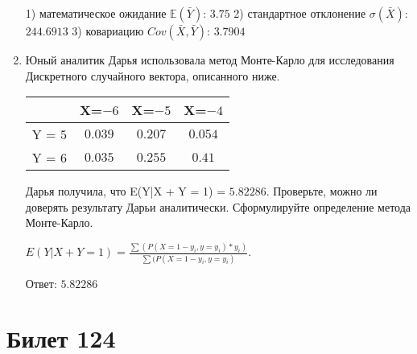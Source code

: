 \documentclass[a4paper,12pt]{article}
\begin{document}
\begin{enumerate}
1) математическое ожидание $\mathbb{E}(\bar Y)$: $3.75$ 
2) стандартное отклонение $\sigma(\bar X)$: $244.6913$
3) ковариацию $Cov(\bar X, \bar Y)$: $3.7904$


\item

    
    	Юный аналитик Дарья использовала метод Монте-Карло для исследования Дискретного случайного вектора, описанного ниже.

        \begin{tabular}{|c|c|c|c|}
	\hline
	& X=$-6$ & X=$-5$ & X=$-4$ \\
	\hline
	Y = $5$ & $0.039$ & $0.207$  &  $0.054$ \\
	\hline
	Y = $6$ & $0.035$ & $0.255$ & $0.41$  \\
	\hline
\end{tabular}

    	Дарья получила, что E(Y|X + Y = 1) = $5.82286$.
    	Проверьте, можно ли доверять результату Дарьи аналитически. Сформулируйте определение метода Монте-Карло.
    


    
        $E(Y|X+Y=1) = \frac{\sum(P(X=1 - y_i, y=y_i) * y_i)}{\sum(P(X=1 - y_i, y=y_i)}$.

        Ответ: $5.82286$
    


\end{enumerate}

\section{Билет 124}
\end{document}
